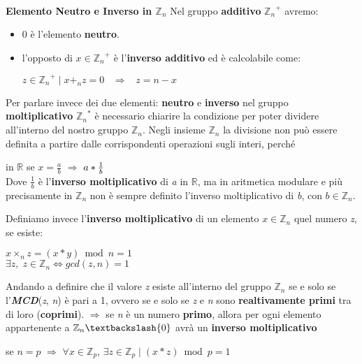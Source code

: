 \   \\
\textbf{Elemento Neutro e Inverso in $\mathbb{Z}_n$} 
\newline
Nel gruppo \textbf{additivo} ${\mathbb{Z}_n}^+$ avremo:
\begin{itemize}
    \item 0 è l'elemento \textbf{neutro}.
    \item l'opposto di $x \in {\mathbb{Z}_n}^+$ è l'\textbf{inverso additivo} ed è calcolabile come:
    \begin{center} 
        $z \in {\mathbb{Z}_n}^+\;|\; x +_n z = 0 \;\;\;\Rightarrow \;\;\; z = n - x$
    \end{center}
\end{itemize}
Per parlare invece dei due elementi: \textbf{neutro} e \textbf{inverso} nel gruppo \textbf{moltiplicativo} ${\mathbb{Z}_n}^*$ è necessario chiarire la condizione per poter dividere all'interno del nostro gruppo $\mathbb{Z}_n$. Negli insieme $\mathbb{Z}_n$ la divisione non può essere definita a partire dalle corrispondenti operazioni sugli interi, perché
\begin{center}
    in $\mathbb{R}$ se $x = \frac{a}{b}$ $\Rightarrow$  $a * {1 \over b}$
    \   \\ 
    Dove $\frac{1}{b}$ è l'\textbf{inverso moltiplicativo} di \textit{a} in $\mathbb{R}$, ma in aritmetica modulare e più precisamente in $\mathbb{Z}_n$ non è sempre definito l'inverso moltiplicativo di \textit{b}, con $b \in \mathbb{Z}_n$.
\end{center}
Definiamo invece l'\textbf{inverso moltiplicativo} di un elemento $x \in \mathbb{Z}_n$ quel numero \textit{z}, se esiste:
\begin{center}
    $x \times_n z = (x * y) \bmod n = 1$ \\
    $\exists z, \;z \in \mathbb{Z}_n \iff gcd(z, n) = 1$
\end{center}
Andando a definire che il valore \textit{z} esiste all'interno del gruppo $\mathbb{Z}_n$ se e solo se l'\textbf{\textit{MCD}}(\textit{z}, \textit{n}) è pari a 1, ovvero se e solo se \textit{z} e \textit{n} sono \textbf{realtivamente primi} tra di loro (\textbf{coprimi}).
\newline
$\Rightarrow$ se \textit{n} è un numero \textbf{primo}, allora per ogni elemento appartenente a $\mathbb{Z}_n \textbackslash \{0\}$ avrà un \textbf{inverso moltiplicativo}
\begin{center}
    se $n = p$ $\Rightarrow$ $\forall x \in \mathbb{Z}_p$, $\exists z \in \mathbb{Z}_p\;|\; (x * z) \bmod p = 1$
\end{center}

